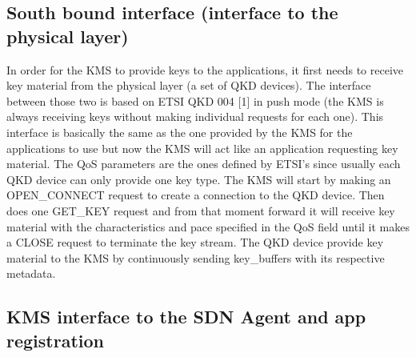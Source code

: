 \begin{refsection}
\begin{itemize}
		\end{itemize}

		
\subsection{South bound interface (interface to the physical layer)}		

In order for the \ac{KMS} to provide keys to the applications, it first needs to receive key material from the physical layer (a set of QKD devices). The interface between those two is based on ETSI QKD 004 [1] in push mode (the KMS is always receiving keys without making individual requests for each one). This interface is basically the same as the one provided by the KMS for the applications to use but now the \ac{KMS} will act like an application requesting key material. The QoS parameters are the ones defined by ETSI's since usually each QKD device can only provide one key type. The KMS will start by making an OPEN\_CONNECT request to create a connection to the QKD device. Then does one GET\_KEY request and from that moment forward it will receive key material with the characteristics and pace specified in the QoS field until it makes a CLOSE request to terminate the key stream. The \ac{QKD} device provide key material to the \ac{KMS} by continuously sending key\_buffers with its respective metadata. 


\subsection{KMS interface to the SDN Agent and app registration}
\label{kms_agent}	


\end{refsection}
